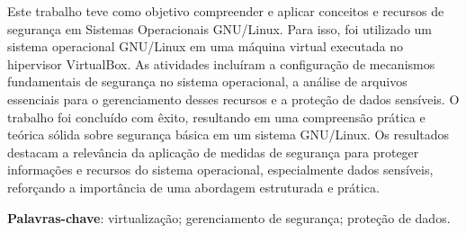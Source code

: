 \documentclass[
    12pt,				%
    oneside,   	        %
    a4paper,			%
    english,			%
    french,				%
    spanish,			%
    brazil,				%
    ]{pacotes/abntex2}
\begin{document}
\frenchspacing 



\imprimirfolhaderosto



\begin{resumo}
Este trabalho teve como objetivo compreender e aplicar conceitos e recursos de segurança em Sistemas Operacionais GNU/Linux. Para isso, foi utilizado um sistema operacional GNU/Linux em uma máquina virtual executada no hipervisor VirtualBox. As atividades incluíram a configuração de mecanismos fundamentais de segurança no sistema operacional, a análise de arquivos essenciais para o gerenciamento desses recursos e a proteção de dados sensíveis. O trabalho foi concluído com êxito, resultando em uma compreensão prática e teórica sólida sobre segurança básica em um sistema GNU/Linux. Os resultados destacam a relevância da aplicação de medidas de segurança para proteger informações e recursos do sistema operacional, especialmente dados sensíveis, reforçando a importância de uma abordagem estruturada e prática.

 \vspace{\onelineskip}
    
 \noindent
 \textbf{Palavras-chave}: virtualização; gerenciamento de segurança; proteção de dados.
\end{resumo}



\end{document}
